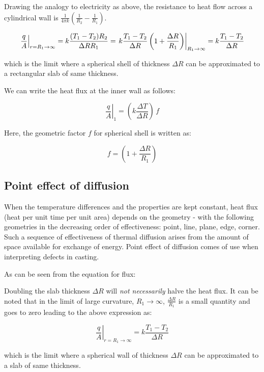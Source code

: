 Drawing the analogy to electricity as above, the resistance to heat flow across
a cylindrical wall is $\frac{1}{4\pi k} \left( \frac{1}{R_2} - \frac{1}{R_1}
\right)$.

$$\left. \frac{q}{A} \right|_{r=R_1 \rightarrow \infty} =  k \frac{(T_1 -
T_2)R_2}{\Delta R R_1} = \left. k \frac{T_1 - T_2}{\Delta R} \left( 1 + {\Delta
R \over R_1}\right) \right|_{R_1 \rightarrow \infty} = k {T_1 - T_2 \over \Delta
R}$$

which is the limit where a spherical shell of thickness $\Delta R$ can be
approximated to a rectangular slab of same thickness.

We can write the heat flux at the inner wall as follows:

\begin{equation}
	\left. \frac{q}{A} \right|_{1} = \left( k \frac{\Delta T}{\Delta R} \right) \, f 
\end{equation}

Here, the geometric factor $f$ for spherical shell is written as:

\begin{equation}
	f = \left(1 + \frac{\Delta R}{R_1} \right)
\end{equation}


\subsection{Point effect of diffusion}

When the temperature differences and the properties are kept constant, heat flux
(heat per unit time per unit area) depends on the geometry - with the following
geometries in the decreasing order of effectiveness: point, line, plane, edge,
corner. Such a sequence of effectiveness of thermal diffusion arises from the
amount of space available for exchange of energy. Point effect of diffusion comes of use when interpreting defects in casting.

As can be seen from the equation for flux:

Doubling the slab thickness $\Delta R$ will \textit{not necessarily} halve the
heat flux. It can be noted that in the limit of large curvature, $R_1
\rightarrow \infty$, $\frac{\Delta R}{R_1}$ is a small quantity and goes to zero
leading to the above expression as:

$$\left. \frac{q}{A}\right|_{r=R_1 \rightarrow \infty} = k \frac{T_1 -
T_2}{\Delta R} $$

which is the limit where a spherical wall of thickness $\Delta R$ can be
approximated to a slab of same thickness.

